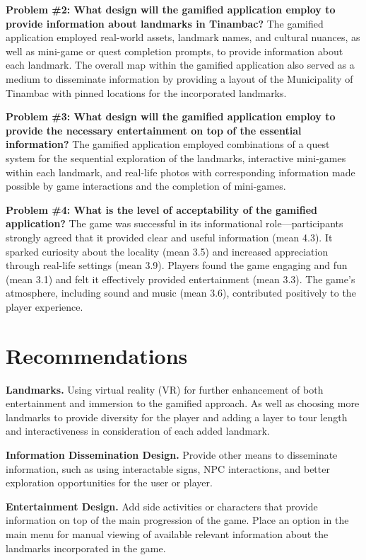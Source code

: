 \documentclass{research}
\begin{document}
\textbf{Problem \#2: What design will the gamified application employ to provide
information about landmarks in Tinambac?} The gamified application employed real-world
assets, landmark names, and cultural nuances, as well as mini-game or quest completion
prompts, to provide information about each landmark. The overall map within the gamified
application also served as a medium to disseminate information by providing a layout of
the Municipality of Tinambac with pinned locations for the incorporated landmarks.

\textbf{Problem \#3: What design will the gamified application employ to provide the
necessary entertainment on top of the essential information?} The gamified application
employed combinations of a quest system for the sequential exploration of the landmarks,
interactive mini-games within each landmark, and real-life photos with corresponding
information made possible by game interactions and the completion of mini-games.

\textbf{Problem \#4: What is the level of acceptability of the gamified application?}
The game was successful in its informational role---participants strongly agreed that
it provided clear and useful information (mean 4.3). It sparked curiosity about the
locality (mean 3.5) and increased appreciation through real-life settings (mean 3.9).
Players found the game engaging and fun (mean 3.1) and felt it effectively provided
entertainment (mean 3.3). The game's atmosphere, including sound and music (mean 3.6),
contributed positively to the player experience.

\section{Recommendations}

\textbf{Landmarks.} Using virtual reality (VR) for further enhancement of both
entertainment and immersion to the gamified approach. As well as choosing more landmarks
to provide diversity for the player and adding a layer to tour length and
interactiveness in consideration of each added landmark.

\textbf{Information Dissemination Design.} Provide other means to disseminate
information, such as using interactable signs, NPC interactions, and better exploration
opportunities for the user or player.

\textbf{Entertainment Design.} Add side activities or characters that provide
information on top of the main progression of the game. Place an option in the main
menu for manual viewing of available relevant information about the landmarks
incorporated in the game.
\end{document}
